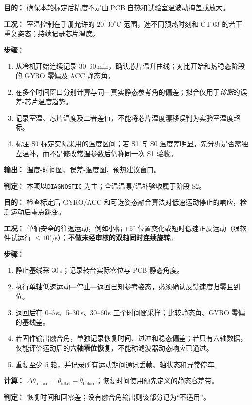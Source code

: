 \textbf{目的：} 确保本轮标定后精度不是由 PCB 自热和试验室温波动掩盖或放大。
\par\textbf{工况：} 室温控制在手册允许的 $20$--$30^\circ\mathrm C$ 范围，选不同预热时刻和 CT-03 的若干重复姿态；持续记录芯片温度。
\par\textbf{步骤：}
\begin{enumerate}
\item 从冷机开始连续记录 $30$--$60\,\mathrm{min}$，确认芯片温升曲线；对比开始和热稳态阶段的 GYRO 零偏及 ACC 静态角。
\item 在多个时间窗口分别计算与同一真实静态参考角的偏差；拟合仅用于\emph{诊断}的误差-芯片温度趋势。
\item 记录室温、芯片温度及二者差值，不能将芯片温度漂移误判为实验室温度超标。
\item 标注 S0 标定实际采用的温度区间；若 S1 与 S0 温度差明显，先分析是否需独立温补，而不是修改常温参数后仍称同一次 S1 验收。
\end{enumerate}
\textbf{输出：} 温度-时间图、误差-温度图、预热建议窗口。
\par\textbf{判定：} 本项以\texttt{DIAGNOSTIC} 为主；全温温漂/温补验收属于阶段 S2。

\textbf{目的：} 检查标定后 GYRO/ACC 和可选姿态融合算法对低速运动停止的响应，检测运动后零点跳变。
\par\textbf{工况：} 单轴安全的往返运动，例如小幅 $\pm5^\circ$ 位置变化或短时低速正反运动（限软件试运行 $\le10^\circ/\mathrm s$）；\textbf{不做未经审核的双轴同时连续旋转}。
\par\textbf{步骤：}
\begin{enumerate}
\item 静止基线采 30\,s；记录转台实际零位与 PCB 静态角度。
\item 执行单轴低速运动—停止—返回已知参考姿态，必须确认反馈速度归零且到位。
\item 返回后在 0--5\,s、5--30\,s、30--60\,s 三个时间窗采样；比较静态角、GYRO 零偏的基线差。
\item 若固件输出融合角，单独记录恢复时间、过冲和稳态偏差；若只有六轴数据，仅能评价运动后的\textbf{六轴零位恢复}，不能称滤波器动态响应已通过。
\item 重复至少 5 轮，并记录所有运动期间通讯丢帧、轴状态和异常停车。
\end{enumerate}
\textbf{计算：} $\Delta\theta_\mathrm{return}=\bar\theta_\mathrm{after}-\bar\theta_\mathrm{before}$；恢复时间使用预先定义的静态容差带。
\par\textbf{判定：} 恢复时间和回零差\pending；没有融合角输出则该部分记为“不适用”。

